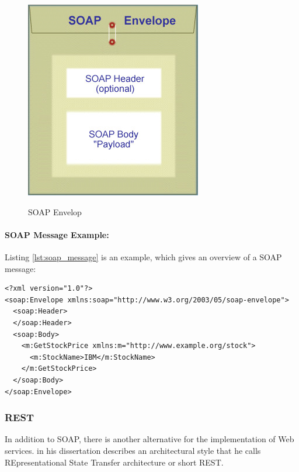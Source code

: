 \begin{figure}[htb]
  \centering
  \includegraphics[scale=0.5]{soap_envelope.jpg}\\
  \caption{\ac{SOAP} Envelop}
  \label{fig:soap_env}
  \protect\cite{oracle_soap}
\end{figure}

\paragraph{\ac{SOAP} Message Example:}

Listing \ref{lst:soap_message} is an example, which gives an overview of a \ac{SOAP} message:

\begin{code}
\begin{verbatim}
<?xml version="1.0"?>
<soap:Envelope xmlns:soap="http://www.w3.org/2003/05/soap-envelope">
  <soap:Header>
  </soap:Header>
  <soap:Body>
    <m:GetStockPrice xmlns:m="http://www.example.org/stock">
      <m:StockName>IBM</m:StockName>
    </m:GetStockPrice>
  </soap:Body>
</soap:Envelope>
\end{verbatim}
\caption{\ac{SOAP} message example}
\label{lst:soap_message}
\end{code}

\subsubsection{\ac{REST}\label{sec:back_tech_ws_rest}}
In addition to \ac{SOAP}, there is another alternative for the implementation of Web services. \citeauthor{Fielding2000} in his dissertation describes an architectural style that he calls REpresentational State Transfer architecture or short \ac{REST}.

